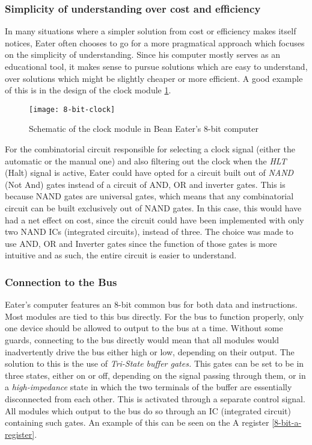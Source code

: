 \subsubsection{Simplicity of understanding over cost and efficiency}

In many situations where a simpler solution from cost or efficiency makes itself notices, Eater often chooses to go for a more pragmatical approach which focuses on the simplicity of understanding. Since his computer mostly serves as an educational tool, it makes sense to pursue solutions which are easy to understand, over solutions which might be slightly cheaper or more efficient. A good example of this is in the design of the clock module \ref{8-bit-clock}.

\begin{figure}[ht]
  \centering
  \texttt{[image: 8-bit-clock]}
  \caption{Schematic of the clock module in Bean Eater's 8-bit computer \cite{eater2019highlevel}}
  \label{8-bit-clock}
\end{figure}

For the combinatorial circuit responsible for selecting a clock signal (either the automatic or the manual one) and also filtering out the clock when the \emph{HLT} (Halt) signal is active, Eater could have opted for a circuit built out of \emph{NAND} (Not And) gates instead of a circuit of AND, OR and inverter gates. This is because NAND gates are universal gates, which means that any combinatorial circuit can be built exclusively out of NAND gates. In this case, this would have had a net effect on cost, since the circuit could have been implemented with only two NAND ICs (integrated circuits), instead of three. The choice was made to use AND, OR and Inverter gates since the function of those gates is more intuitive and as such, the entire circuit is easier to understand.

\subsubsection{Connection to the Bus}

Eater's computer features an 8-bit common bus for both data and instructions. Most modules are tied to this bus directly. For the bus to function properly, only one device should be allowed to output to the bus at a time. Without some guards, connecting to the bus directly would mean that all modules would inadvertently drive the bus either high or low, depending on their output. The solution to this is the use of \emph{Tri-State buffer gates.} This gates can be set to be in three states, either on or off, depending on the signal passing through them, or in a \emph{high-impedance} state in which the two terminals of the buffer are essentially disconnected from each other. This is activated through a separate control signal. All modules which output to the bus do so through an IC (integrated circuit) containing such gates. An example of this can be seen on the A register \ref{8-bit-a-register}.

